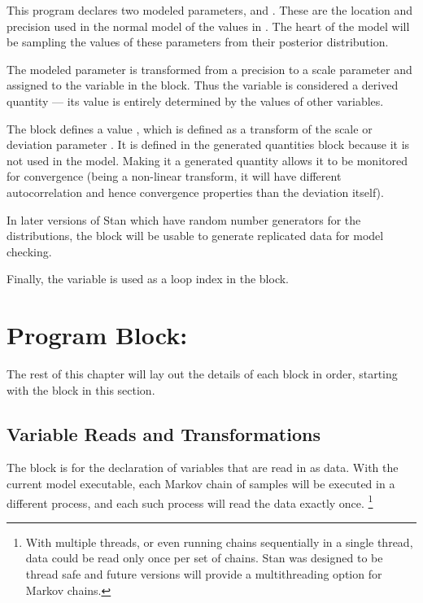 This program declares two modeled parameters,  and
.  These are the location and precision used in the normal
model of the values in .  The heart of the model will be
sampling the values of these parameters from their posterior
distribution.

The modeled parameter  is transformed from a precision to
a scale parameter and assigned to the variable  in the
 block. Thus the variable 
is considered a derived quantity --- its value is entirely determined
by the values of other variables.  

The  block defines a value
, which is defined as a transform of the scale or
deviation parameter .  It is defined in the generated
quantities block because it is not used in the model.  Making it
a generated quantity allows it to be monitored for convergence (being
a non-linear transform, it will have different autocorrelation and
hence convergence properties than the deviation itself).  

In later versions of Stan which have random number generators for
the distributions, the  block will be
usable to generate replicated data for model checking.

Finally, the variable  is used as a loop index in the
 block.  


\section{Program Block: }

The rest of this chapter will lay out the details of each block in
order, starting with the  block in this section.

\subsection{Variable Reads and Transformations}

The  block is for the declaration of variables that are
read in as data.  With the current model executable, each Markov chain
of samples will be executed in a different process, and each such
process will read the data exactly once.%
%
\footnote{With multiple threads, or even running chains sequentially
  in a single thread, data could be read only once per set of
  chains. Stan was designed to be thread safe and future versions 
  will provide a multithreading option for Markov chains.\label{thread.footnote}}
%

